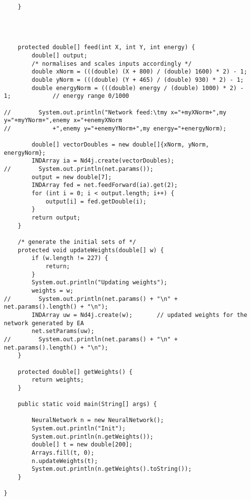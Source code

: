 \documentclass[12pt,a4paper]{article}
\begin{document}
\begin{lstlisting}
    }




    protected double[] feed(int X, int Y, int energy) {
        double[] output;
        /* normalises and scales inputs accordingly */
        double xNorm = (((double) (X + 800) / (double) 1600) * 2) - 1;
        double yNorm = (((double) (Y + 465) / (double) 930) * 2) - 1;
        double energyNorm = (((double) energy / (double) 1000) * 2) - 1;            // energy range 0/1000
        
//        System.out.println("Network feed:\tmy x="+myXNorm+",my y="+myYNorm+",enemy x="+enemyXNorm
//            +",enemy y="+enemyYNorm+",my energy="+energyNorm);

        double[] vectorDoubles = new double[]{xNorm, yNorm, energyNorm};
        INDArray ia = Nd4j.create(vectorDoubles);
//        System.out.println(net.params());
        output = new double[7];
        INDArray fed = net.feedForward(ia).get(2);
        for (int i = 0; i < output.length; i++) {
            output[i] = fed.getDouble(i);
        }
        return output;
    }

    /* generate the initial sets of */
    protected void updateWeights(double[] w) {
        if (w.length != 227) {
            return;
        }
        System.out.println("Updating weights");
        weights = w;
//        System.out.println(net.params() + "\n" + net.params().length() + "\n");
        INDArray uw = Nd4j.create(w);       // updated weights for the network generated by EA
        net.setParams(uw);
//        System.out.println(net.params() + "\n" + net.params().length() + "\n");
    }

    protected double[] getWeights() {
        return weights;
    }

    public static void main(String[] args) {

        NeuralNetwork n = new NeuralNetwork();
        System.out.println("Init");
        System.out.println(n.getWeights());
        double[] t = new double[200];
        Arrays.fill(t, 0);
        n.updateWeights(t);
        System.out.println(n.getWeights().toString());
    }

}

\end{lstlisting}
\newpage
\end{document}
